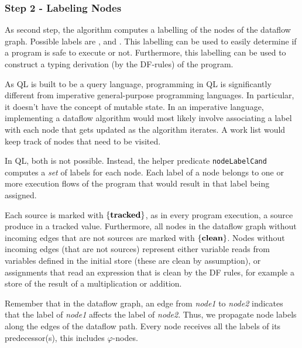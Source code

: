 \subsubsection*{Step 2 - Labeling Nodes}
\newcommand{\coloredset}[1]{{\color{red}$\{#1\}$}}
\newcommand{\setclean}{\coloredset{\labclean}}
\newcommand{\settracked}{\coloredset{\labtracked}}
\newcommand{\setboth}{\coloredset{\labclean, \labtracked}}
\newcommand{\clclean}{:\ {\color{red}$\lclean$}}
\newcommand{\cltracked}{:\ {\color{red}$\ltracked$}}
\newcommand{\clunknown}{:\ {\color{red}$\lunknown$}}

As second step, the algorithm computes a labelling of the nodes of the dataflow graph.
Possible labels are \labclean, \labtracked and \labunknown.
This labelling can be used to easily determine if a program is safe to execute or not.
Furthermore, this labelling can be used to construct a typing derivation (by the DF-rules)
of the program.

As QL is built to be a query language, programming in QL is significantly different
from imperative general-purpose programming languages.
In particular, it doesn't have the concept of mutable state.
In an imperative language, implementing a dataflow algorithm would most
likely involve associating a label with each node that gets updated as the 
algorithm iterates.
A work list would keep track of nodes that need to be visited.

In QL, both is not possible.
Instead, the helper predicate \texttt{nodeLabelCand} computes a \emph{set} of
labels for each node.
Each label of a node belongs to one or more execution flows of the program 
that would result in that label being assigned.

Each source is marked with $\{\textbf{tracked}\}$, as in every program execution,
a source produce in a tracked value.
Furthermore, all nodes in the dataflow graph without
incoming edges that are not sources are marked with $\{\textbf{clean}\}$.
Nodes without incoming edges (that are not sources) represent either variable reads 
from variables defined in the initial store (these are clean by assumption), or 
assignments that read an expression that is clean by the DF rules, for example
a store of the result of a multiplication or addition.

Remember that in the dataflow graph, an edge from \textit{node1} to \textit{node2}
indicates that the label of \textit{node1} affects the label of \textit{node2}.
Thus, we propagate node labels along the edges of the dataflow path.
Every node receives all the labels of its predecessor(s), this includes
$\varphi$-nodes.

